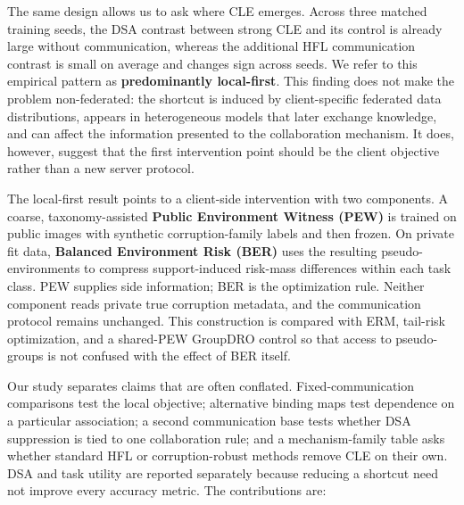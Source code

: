 The same design allows us to ask where CLE emerges. Across three matched training seeds, the DSA contrast between strong CLE and its control is already large without communication, whereas the additional HFL communication contrast is small on average and changes sign across seeds. We refer to this empirical pattern as \textbf{predominantly local-first}. This finding does not make the problem non-federated: the shortcut is induced by client-specific federated data distributions, appears in heterogeneous models that later exchange knowledge, and can affect the information presented to the collaboration mechanism. It does, however, suggest that the first intervention point should be the client objective rather than a new server protocol.

The local-first result points to a client-side intervention with two components. A coarse, taxonomy-assisted \textbf{Public Environment Witness (PEW)} is trained on public images with synthetic corruption-family labels and then frozen. On private fit data, \textbf{Balanced Environment Risk (BER)} uses the resulting pseudo-environments to compress support-induced risk-mass differences within each task class. PEW supplies side information; BER is the optimization rule. Neither component reads private true corruption metadata, and the communication protocol remains unchanged. This construction is compared with ERM, tail-risk optimization, and a shared-PEW GroupDRO control so that access to pseudo-groups is not confused with the effect of BER itself.

Our study separates claims that are often conflated. Fixed-communication comparisons test the local objective; alternative binding maps test dependence on a particular association; a second communication base tests whether DSA suppression is tied to one collaboration rule; and a mechanism-family table asks whether standard HFL or corruption-robust methods remove CLE on their own. DSA and task utility are reported separately because reducing a shortcut need not improve every accuracy metric. The contributions are:

